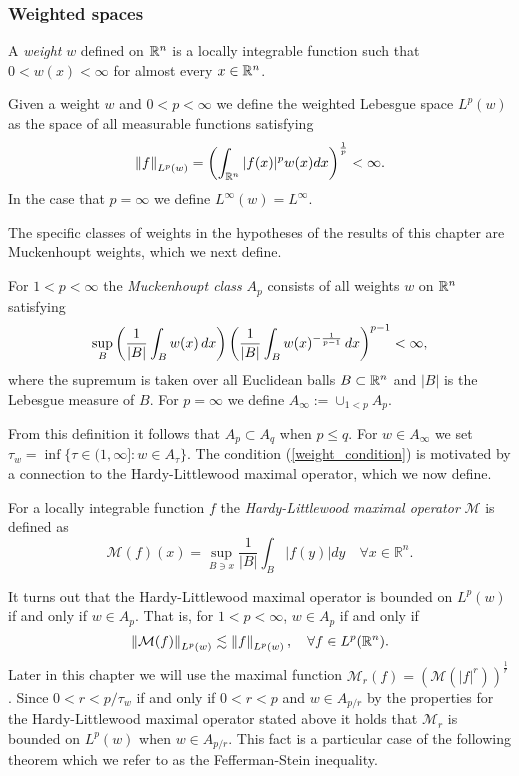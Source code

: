 {\subsubsection{Weighted spaces}

\begin{dfn}
A \textit{weight} $w$ defined on ${{\mathbb R}^n}$ is a locally integrable function such that $0<w(x)<\infty$ for almost every $x\in{{\mathbb R}^n}$.
\end{dfn}

Given a weight $w$ and $0<p<\infty$ we define the weighted Lebesgue space $L^p(w)$ as the space of all measurable functions satisfying 
\[ \left\|f\right\|_{L^p(w)} = \left(\int_{{\mathbb R}^n} |f(x)|^p w(x)dx\right)^{\frac{1}{p}} < \infty. \]
In the case that $p=\infty$ we define $L^\infty (w) = L^\infty$. 

The specific classes of weights in the hypotheses of the results of this chapter are Muckenhoupt weights, which we next define. 
\begin{dfn}
For $1<p<\infty$ the \textit{Muckenhoupt class} $A_p$ consists of all weights $w$ on ${{\mathbb R}^n}$ satisfying 
 \begin{equation}\label{weight_condition}
 \sup_B\left(\frac{1}{\left\vert B \right\vert}\int_Bw(x)\, dx\right)\left(\frac{1}{\left\vert B \right\vert}\int_Bw(x)^{-\frac{1}{p-1}}\, dx\right)^{p-1}<\infty,
 \end{equation}
where the supremum is taken over all Euclidean balls $B\subset{{\mathbb R}^n}$ and $|B|$ is the Lebesgue measure of $B$. For $p=\infty$ we define $A_\infty := \cup_{1<p} A_p$. 
\end{dfn}

From this definition it follows that $A_p \subset A_q$ when $p\leq q$. 
For $w\in A_\infty$ we set 
$\tau_w = \inf\{\tau \in (1,\infty]: w\in A_\tau \}$. 
The condition (\ref{weight_condition}) is motivated by a connection to the Hardy-Littlewood maximal operator, which we now define.
\begin{dfn}
For a locally integrable function $f$ the \textit{Hardy-Littlewood maximal operator} $\mathcal{M}$ is defined as 
\[ \mathcal{M}(f)(x)  = \sup_{B \ni x} \frac{1}{|B|}\int_B |f(y)|dy \quad \forall x\in\mathbb{R}^n. \]
\end{dfn}
It turns out that the Hardy-Littlewood maximal operator is bounded on $L^p(w)$ if and only if $w\in A_p$. That is, for $1<p<\infty$, $w\in A_p$ if and only if 
\[\left\|\mathcal{M}(f)\right\|_{L^p (w)} \lesssim \left\|f\right\|_{L^p (w)}, \quad \forall f\in L^p({{\mathbb R}^n}). \]
Later in this chapter we will use the maximal function $\mathcal{M}_r (f) = \left(\mathcal{M}(|f|^r)\right)^{\frac{1}{r}}$. Since $0<r<p/\tau_w$ if and only if $0<r<p$ and $w\in A_{p/r}$ by the properties for the Hardy-Littlewood maximal operator stated above it holds that $\mathcal{M}_r$ is bounded on $L^p (w)$ when $w\in A_{p/r}$. This fact is a particular case of the following theorem which we refer to as the Fefferman-Stein inequality.

}
